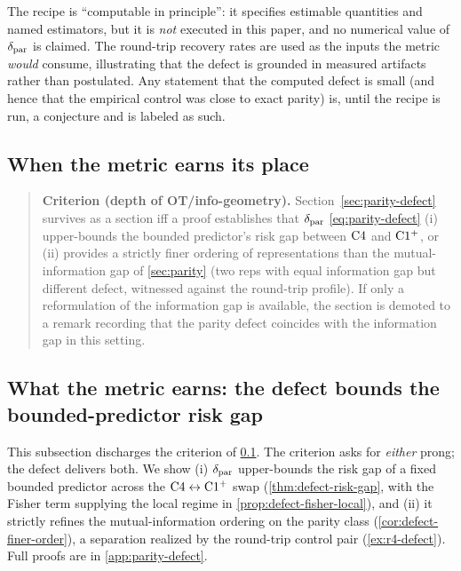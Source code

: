 \begin{remark}
\label{rem:defect-status}
The recipe is ``computable in principle'': it specifies estimable quantities
and named estimators, but it is \emph{not} executed in this paper, and no
numerical value of $\delta_{\mathrm{par}}$ is claimed. The round-trip recovery rates
are used as the inputs the metric \emph{would} consume, illustrating that the
defect is grounded in measured artifacts rather than postulated. Any statement
that the computed defect is small (and hence that the empirical control was
close to exact parity) is, until the recipe is run, a conjecture and is labeled
as such.
\end{remark}

\subsection{When the metric earns its place}
\label{subsec:defect-gonogo}

\begin{quote}
\textbf{Criterion (depth of OT/info-geometry).} Section~\ref{sec:parity-defect}
survives as a section iff a proof establishes that $\delta_{\mathrm{par}}$
\eqref{eq:parity-defect} (i) upper-bounds the bounded predictor's risk gap
between $\mathrm{C}4$ and $\mathrm{C1^{+}}$, or (ii) provides a strictly finer
ordering of representations than the mutual-information gap of
\cref{sec:parity} (two reps with equal information gap but different defect,
witnessed against the round-trip profile). If only a reformulation of
the information gap is available, the section is demoted to a remark recording
that the parity defect coincides with the information gap in this setting.
\end{quote}

\subsection{What the metric earns: the defect bounds the bounded-predictor risk gap}
\label{subsec:defect-theorem}

This subsection discharges the criterion of \cref{subsec:defect-gonogo}. The
criterion asks for \emph{either} prong; the defect
delivers both. We show (i) $\delta_{\mathrm{par}}$ upper-bounds the risk gap of a fixed
bounded predictor across the $\mathrm{C}4\leftrightarrow\mathrm{C1^{+}}$ swap
(\cref{thm:defect-risk-gap}, with the Fisher term supplying the local regime in
\cref{prop:defect-fisher-local}), and (ii) it strictly refines the
mutual-information ordering on the parity class
(\cref{cor:defect-finer-order}), a separation realized by the round-trip
control pair (\cref{ex:r4-defect}). Full proofs are in \cref{app:parity-defect}.

